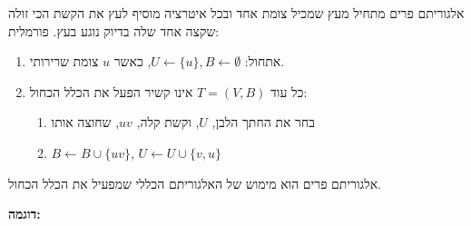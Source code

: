 אלגוריתם פרים מתחיל מעץ שמכיל צומת אחד ובכל איטרציה מוסיף לעץ את הקשת הכי זולה שקצה
אחד שלה בדיוק נוגע בעץ.
פורמלית:
\begin{enumerate}
\item
אתחול:
$U \leftarrow \{u\}, B \leftarrow \emptyset$, 
כאשר $u$ צומת שרירותי.
\item
כל עוד 
$T = (V, B)$
אינו קשיר הפעל את הכלל הכחול:
\begin{enumerate}
\item
בחר את החתך הלבן, $U$, וקשת קלה, $uv$, שחוצה אותו 
\item
$B \leftarrow B \cup \{uv\}$, 
$U \leftarrow U \cup \{v, u\}$
\end{enumerate}
\end{enumerate}
\begin{observation}
אלגוריתם פרים הוא מימוש של האלגוריתם הכללי שמפעיל את הכלל הכחול.
\end{observation}



\textbf{דוגמה:}

\begin{center}
\end{center}




